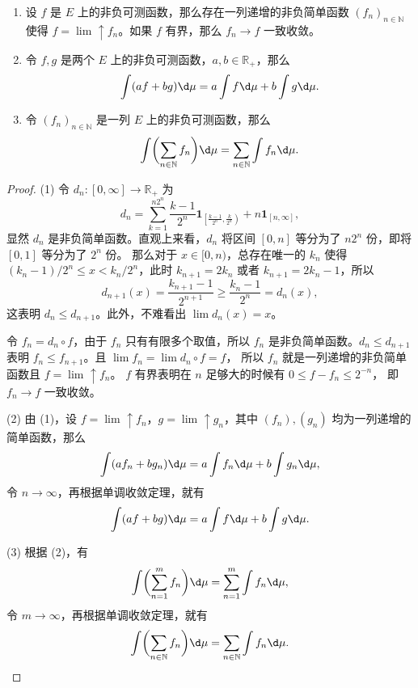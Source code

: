 \documentclass[fontset=none]{Notes}
\newcommand{\ulim}[1][]{\lim_{#1}\mathrel{\uparrow}}
\begin{document}
\begin{proposition}\label{prop:property of integral of positive function}
  \mbox{}
  \begin{enumerate}
    \item 设 $f$ 是 $E$ 上的非负可测函数，那么存在一列递增的非负简单函数 $(f_n)_{n\in \mathbb{N}}$
    使得 $f=\ulim f_n$。如果 $f$ 有界，那么 $f_n\to f$ 一致收敛。
    \item 令 $f,g$ 是两个 $E$ 上的非负可测函数，$a,b\in \mathbb{R}_+$，那么
    \[
      \int (af+bg)\d\mu=a\int f\d\mu+b\int g\d\mu.
    \]
    \item 令 $(f_n)_{n\in \mathbb{N}}$ 是一列 $E$ 上的非负可测函数，那么
    \[
      \int\biggl(\sum_{n\in \mathbb{N}}f_n\biggr)\d\mu=\sum_{n\in \mathbb{N}}\int f_n\d\mu.
    \]
  \end{enumerate}
\end{proposition}
\begin{proof}
  (1) 令 $d_n:[0,\infty]\to \mathbb{R}_+$ 为
  \[
    d_n=\sum_{k=1}^{n2^n}\frac{k-1}{2^n}  
    \mathbold 1_{\left[\frac{k-1}{2^n},\frac{k}{2^n}\right)}+
    n\mathbold 1_{[n,\infty]},
  \]
  显然 $d_n$ 是非负简单函数。直观上来看，$d_n$ 将区间 $[0,n]$
  等分为了 $n2^n$ 份，即将 $[0,1]$ 等分为了 $2^n$ 份。
  那么对于 $x\in [0,n)$，总存在唯一的 $k_n$ 使得 
  $(k_n-1)/2^n\leq x< k_n/2^n$，此时 $k_{n+1}=2k_n$
  或者 $k_{n+1}=2k_n-1$，所以
  \[
    d_{n+1}(x)  =\frac{k_{n+1}-1}{2^{n+1}}\geq \frac{k_n-1 }{2^n}
    =d_n(x),
  \]
  这表明 $d_n\leq d_{n+1}$。此外，不难看出 $\lim d_n(x)=x$。
  
  令 $f_n=d_n\circ f$，由于 $f_n$ 只有有限多个取值，所以
  $f_n$ 是非负简单函数。$d_n\leq d_{n+1}$ 表明
  $f_n\leq f_{n+1}$。且 $\lim f_n=\lim d_n\circ f=f$，
  所以 $f_n$ 就是一列递增的非负简单函数且 $f=\ulim f_n$。
  $f$ 有界表明在 $n$ 足够大的时候有 $0\leq f-f_n\leq 2^{-n}$，
  即 $f_n\to f$ 一致收敛。

  (2) 由 (1)，设 $f=\ulim f_n$，$g=\ulim g_n$，其中 $(f_n),(g_n)$
  均为一列递增的简单函数，那么
  \[
    \int (af_n+bg_n)\d\mu=a\int f_n\d\mu+b\int g_n\d\mu,  
  \]
  令 $n\to\infty$，再根据单调收敛定理，就有
  \[
    \int (af+bg)\d\mu=a\int f\d\mu+b\int g\d\mu.
  \]

  (3) 根据 (2)，有
  \[
    \int\biggl(\sum_{n=1}^m f_n\biggr)  \d\mu=
    \sum_{n=1}^m \int f_n\d\mu,
  \]
  令 $m\to\infty$，再根据单调收敛定理，就有
  \[
    \int\biggl(\sum_{n\in \mathbb{N}}f_n\biggr)\d\mu=\sum_{n\in \mathbb{N}}\int f_n\d\mu.
    \qedhere
  \]
\end{proof}
\end{document}
